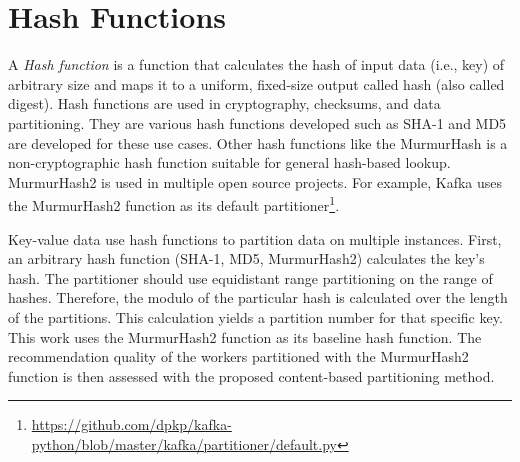 \section{Hash Functions}
\label{sec:hash-functions}
A \emph{Hash function} is a function that calculates the hash of input data (i.e., key) of arbitrary size and maps it to a uniform, fixed-size output called hash (also called digest). Hash functions are used in cryptography, checksums, and data partitioning. They are various hash functions developed such as SHA-1 \cite{eastlakeUSSecureHash2001} and MD5 \cite{rivestMD5MessageDigestAlgorithm1992} are developed for these use cases. Other hash functions like the MurmurHash is a non-cryptographic hash function suitable for general hash-based lookup. MurmurHash2 is used in multiple open source projects. For example, Kafka uses the MurmurHash2 function as its default partitioner\footnote{\url{https://github.com/dpkp/kafka-python/blob/master/kafka/partitioner/default.py}}.


Key-value data use hash functions to partition data on multiple instances. First, an arbitrary hash function (SHA-1, MD5, MurmurHash2) calculates the key's hash. The partitioner should use equidistant range partitioning on the range of hashes. Therefore, the modulo of the particular hash is calculated over the length of the partitions. This calculation yields a partition number for that specific key. This work uses the MurmurHash2 function as its baseline hash function. The recommendation quality of the workers partitioned with the MurmurHash2 function is then assessed with the proposed content-based partitioning method.